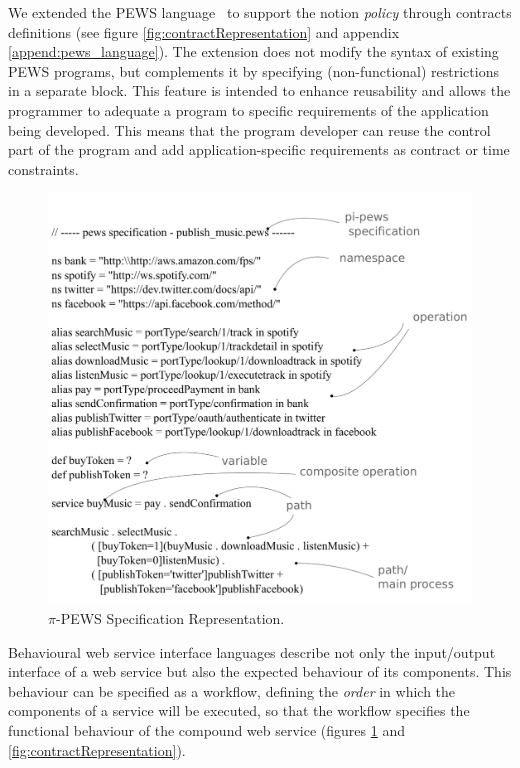  We extended the PEWS language~\cite{Placido2010LTPD} to support the notion
\textit{policy} through contracts definitions (see figure
\ref{fig:contractRepresentation} and appendix \ref{append:pews_language}). The
extension does not modify the syntax of existing PEWS programs, but complements
it by specifying (non-functional) restrictions in a separate block. This feature
is intended to enhance reusability and allows the programmer to adequate a
program to specific requirements of the application being developed. This means
that the program developer can reuse the control part of the program and add
application-specific requirements as contract or time constraints.

 \begin{figure}[ht!]
\centering
\includegraphics[width=.9\textwidth]{chapters/methodology/figs/pewsEspecification.pdf}
\caption{$\pi$-PEWS Specification Representation.}
\label{fig:pewsRepresentation}
\end{figure}

 Behavioural web service interface languages describe not only the input/output
interface of a web service but also the expected behaviour of its components.
This behaviour can be specified as a workflow, defining the \textit{order} in
which the components of a service will be executed, so that the workflow
specifies the functional behaviour of the compound web service (figures \ref{fig:pewsRepresentation} and
\ref{fig:contractRepresentation}). 

